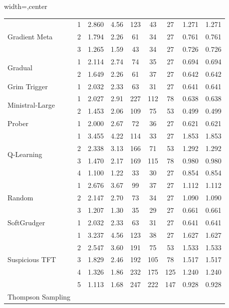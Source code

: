 \begin{table}[htbp]
\begin{adjustbox}{width=\textwidth,center}
\begin{tabular}{|l|c|c|c|c|c|c|c|c|}
\hline
\multirow{3}{*}{Gradient Meta} & 
1 & 
2.860 & 
4.56 & 
123 & 
43 & 
27 & 
1.271 & 
1.271 \\
 & 
2 & 
1.794 & 
2.26 & 
61 & 
34 & 
27 & 
0.761 & 
0.761 \\
 & 
3 & 
1.265 & 
1.59 & 
43 & 
34 & 
27 & 
0.726 & 
0.726 \\
\hline
\multirow{2}{*}{Gradual} & 
1 & 
2.114 & 
2.74 & 
74 & 
35 & 
27 & 
0.694 & 
0.694 \\
 & 
2 & 
1.649 & 
2.26 & 
61 & 
37 & 
27 & 
0.642 & 
0.642 \\
\hline
\multirow{1}{*}{Grim Trigger} & 
1 & 
2.032 & 
2.33 & 
63 & 
31 & 
27 & 
0.641 & 
0.641 \\
\hline
\multirow{2}{*}{Ministral-Large} & 
1 & 
2.027 & 
2.91 & 
227 & 
112 & 
78 & 
0.638 & 
0.638 \\
 & 
2 & 
1.453 & 
2.06 & 
109 & 
75 & 
53 & 
0.499 & 
0.499 \\
\hline
\multirow{1}{*}{Prober} & 
1 & 
2.000 & 
2.67 & 
72 & 
36 & 
27 & 
0.621 & 
0.621 \\
\hline
\multirow{4}{*}{Q-Learning} & 
1 & 
3.455 & 
4.22 & 
114 & 
33 & 
27 & 
1.853 & 
1.853 \\
 & 
2 & 
2.338 & 
3.13 & 
166 & 
71 & 
53 & 
1.292 & 
1.292 \\
 & 
3 & 
1.470 & 
2.17 & 
169 & 
115 & 
78 & 
0.980 & 
0.980 \\
 & 
4 & 
1.100 & 
1.22 & 
33 & 
30 & 
27 & 
0.854 & 
0.854 \\
\hline
\multirow{3}{*}{Random} & 
1 & 
2.676 & 
3.67 & 
99 & 
37 & 
27 & 
1.112 & 
1.112 \\
 & 
2 & 
2.147 & 
2.70 & 
73 & 
34 & 
27 & 
1.090 & 
1.090 \\
 & 
3 & 
1.207 & 
1.30 & 
35 & 
29 & 
27 & 
0.661 & 
0.661 \\
\hline
\multirow{1}{*}{SoftGrudger} & 
1 & 
2.032 & 
2.33 & 
63 & 
31 & 
27 & 
0.641 & 
0.641 \\
\hline
\multirow{5}{*}{Suspicious TFT} & 
1 & 
3.237 & 
4.56 & 
123 & 
38 & 
27 & 
1.627 & 
1.627 \\
 & 
2 & 
2.547 & 
3.60 & 
191 & 
75 & 
53 & 
1.533 & 
1.533 \\
 & 
3 & 
1.829 & 
2.46 & 
192 & 
105 & 
78 & 
1.517 & 
1.517 \\
 & 
4 & 
1.326 & 
1.86 & 
232 & 
175 & 
125 & 
1.240 & 
1.240 \\
 & 
5 & 
1.113 & 
1.68 & 
247 & 
222 & 
147 & 
0.928 & 
0.928 \\
\hline
\multirow{3}{*}{Thompson Sampling} & 

\end{tabular}
\end{adjustbox}
\end{table}
